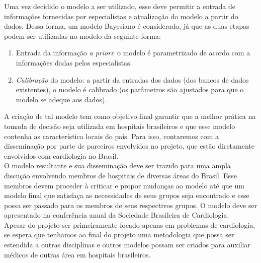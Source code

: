\documentclass{article}
\begin{document}
Uma vez decidido o modelo a ser utilizado, esse deve permitir a entrada de informações fornecidas por especialistas 
e atualização do modelo a partir do dados. 
Dessa forma, um modelo Bayesiano é considerado, já que as duas etapas podem ser utilizadas no modelo da seguinte forma:
 \begin{enumerate} 
	\item Entrada da informação \textit{a priori}: o modelo é parametrizado de acordo com a informações dadas 
		pelos especialistas.
	\item \textit{Calibração} do modelo: a partir da entradas dos dados (dos bancos de dados existentes), 
		o modelo é calibrado (os parâmetros são ajustados para que o modelo se adeque aos dados).
 \end{enumerate}
A criação de tal modelo tem como objetivo final garantir que a melhor prática na tomada de decisão seja utilizada 
em hospitais brasileiros e que esse modelo contenha as característica locais do país. 
Para isso, contaremos com a disseminação por parte de parceiros envolvidos no projeto, que estão diretamente envolvidos 
com cardiologia no Brasil.\\
O modelo resultante e sua disseminação deve ser trazido para uma ampla discução envolvendo membros de hospitais 
de diversas áreas do Brasil. Esse membros devem proceder à criticar e propor mudanças ao modelo até que um modelo 
final que satisfaça as necessidades de seus grupos seja encontrado e esse possa ser passado para os membros 
de seus respectivos grupos. O modelo deve ser apresentado na conferência anual da Sociedade Brasileira de Cardiologia.\\


Apesar do projeto ser primeiramente focado apenas em problemas de cardiologia, se espera que tenhamos 
ao final do projeto uma metodologia que possa ser estendida a outras disciplinas e outros modelos possam 
ser criados para auxiliar médicos de outras área em hospitais brasileiros.
\end{document}
